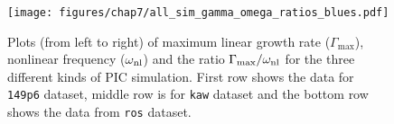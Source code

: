         \begin{figure}
            \begin{center}
                \texttt{[image: figures/chap7/all\_sim\_gamma\_omega\_ratios\_blues.pdf]}
                \caption[Comparison plot of $\Gamma_{\max}$, $\omega_{\rm nl}$ and
                $\Gamma_{\max}/\omega_{\rm nl}$ for simulations]{Plots (from left to right) of
                maximum linear growth rate ($\Gamma_{\max}$), nonlinear frequency ($\omega_{\rm
                nl}$) and the ratio $\Gamma_{\max}/\omega_{\rm nl}$ for the three different kinds of
                PIC simulation. First row shows the data for \texttt{149p6} dataset, middle row is
                for \texttt{kaw} dataset and the bottom row shows the data from \texttt{ros}
                dataset.}
                \label{fig:ratio_allsim}
            \end{center}
        \end{figure}

